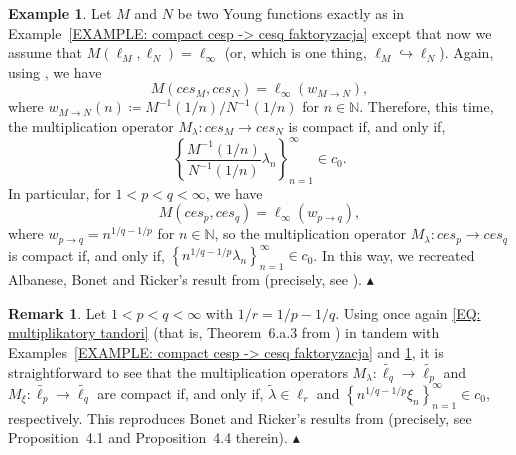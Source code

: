 \documentclass[11pt]{amsart}
\theoremstyle{definition}
\theoremstyle{definition}
\theoremstyle{definition}
\theoremstyle{definition}
\theoremstyle{definition}
\theoremstyle{definition}
\newtheorem{remark}[theorem]{Remark}
\theoremstyle{definition}
\newtheorem{example}[theorem]{Example}
\theoremstyle{definition}
\numberwithin{equation}{section}
\numberwithin{equation}{section}
\numberwithin{equation}{section}
\theoremstyle{definition}
\theoremstyle{definition}
\theoremstyle{definition}
\theoremstyle{definition}
\theoremstyle{definition}
\theoremstyle{definition}
\newcommand\xqed[1]{%
	\leavevmode\unskip\penalty9999 \hbox{}\nobreak\hfill
	\quad\hbox{#1}}
\newcommand\demo{\xqed{{\Large $\blacktriangle$}}}
\begin{document}
	\begin{example} \label{Remark: ces_p -> ces_q [ABR18]}
		Let $M$ and $N$ be two Young functions exactly as in Example~\ref{EXAMPLE: compact cesp -> cesq faktoryzacja}
		except that now we assume that $M(\ell_M,\ell_N) = \ell_{\infty}$ (or, which is one thing, $\ell_M \hookrightarrow \ell_N$).
		Again, using \cite[Example~6.b.1]{KT24}, we have
		\begin{equation} \label{second situation}
			M(ces_M,ces_N) = \ell_{\infty}(w_{M \to N}),
		\end{equation}
		where $w_{M \to N}(n) \coloneqq M^{-1}(1/n)/N^{-1}(1/n)$ for $n \in \mathbb{N}$.
		Therefore, this time, the multiplication operator $M_{\lambda} \colon ces_M \rightarrow ces_N$ is compact if, and only if,
		\begin{equation*}
			\left\{ \frac{M^{-1}(1/n)}{N^{-1}(1/n)} \lambda_n \right\}_{n=1}^{\infty} \in c_0.
		\end{equation*}
		In particular, for $1 < p < q < \infty$, we have
		\begin{equation}
			M(ces_p, ces_q) = \ell_{\infty}\left( w_{p \to q} \right),
		\end{equation}
		where $w_{p \to q} = n^{1/q - 1/p}$ for $n \in \mathbb{N}$, so the multiplication operator $M_{\lambda} \colon ces_p \rightarrow ces_q$
		is compact if, and only if, $\left\{ n^{1/q-1/p} \lambda_n \right\}_{n=1}^{\infty} \in c_0$.
		In this way, we recreated Albanese, Bonet and Ricker's result from \cite{ABR18} (precisely, see \cite[Proposition~2.2]{ABR18}).
		\demo
\end{example}

\begin{remark} \label{REMARK: jak wynioskowac Tandori lp -> lq}
	Let $1 < p < q < \infty$ with $1/r = 1/p - 1/q$.
	Using once again \eqref{EQ: multiplikatory tandori} (that is, Theorem~6.a.3 from \cite{KT24}) in tandem with
	Examples~\ref{EXAMPLE: compact cesp -> cesq faktoryzacja} and \ref{Remark: ces_p -> ces_q [ABR18]},
	it is straightforward to see that the multiplication operators
	$M_{\lambda} \colon \widetilde{\ell_q} \rightarrow \widetilde{\ell_p}$ and $M_{\xi} \colon \widetilde{\ell_p} \rightarrow \widetilde{\ell_q}$
	are compact if, and only if, $\widetilde{\lambda} \in \ell_r$ and $\left\{ n^{1/q-1/p} \xi_n \right\}_{n=1}^{\infty} \in c_0$, respectively.
	This reproduces Bonet and Ricker's results from \cite{BR20} (precisely, see Proposition~4.1 and Proposition~4.4 therein).
	\demo
\end{remark}
\end{document}
